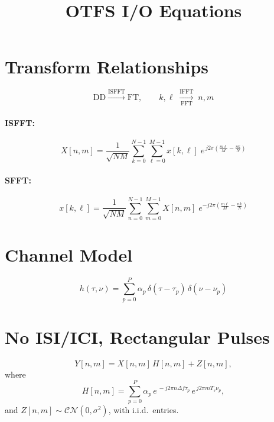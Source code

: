 \documentclass[12pt]{article}
\title{OTFS I/O Equations}
\author{}
\date{}
\begin{document}
\maketitle

\section*{Transform Relationships}

\[
  \text{DD} \xrightarrow{\text{ISFFT}} \text{FT},
  \qquad
  k,\ell \;\xrightarrow[\displaystyle\text{FFT}]{\displaystyle\text{IFFT}}\; n,m
\]

\paragraph{ISFFT:}
\[
  X[n,m] = \frac{1}{\sqrt{NM}}
    \sum_{k=0}^{N-1}\sum_{\ell=0}^{M-1}
    x[k,\ell]\;
    e^{\,j2\pi\!\left(\frac{m\ell}{M}-\frac{nk}{N}\right)}
\]

\paragraph{SFFT:}
\[
  x[k,\ell] = \frac{1}{\sqrt{NM}}
    \sum_{n=0}^{N-1}\sum_{m=0}^{M-1}
    X[n,m]\;
    e^{-j2\pi\!\left(\frac{m\ell}{M}-\frac{nk}{N}\right)}
\]

\section*{Channel Model}

\[
  h(\tau,\nu) = \sum_{p=0}^{P}\alpha_p\,
    \delta(\tau-\tau_p)\,\delta(\nu-\nu_p)
\]

\section*{No ISI/ICI, Rectangular Pulses}

\[
  Y[n,m] = X[n,m]\,H[n,m] + Z[n,m],
\]
where
\[
  H[n,m] = \sum_{p=0}^{P}\alpha_p\,
    e^{\,-j2\pi n\Delta f\tau_p}\,
    e^{\,j2\pi m T_s\nu_p},
\]
and $Z[n,m]\sim\mathcal{CN}(0,\sigma^2)$, with i.i.d.\ entries.
\end{document}
